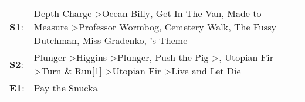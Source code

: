 \begin{supertabular}{p{0.03\textwidth}p{0.92\textwidth}}
 \textbf{S1}:  &                Depth Charge\textsuperscript{} \textgreater \enspace Ocean Billy\textsuperscript{}, \enspace Get In The Van\textsuperscript{}, \enspace Made to Measure\textsuperscript{} \textgreater \enspace Professor Wormbog\textsuperscript{}, \enspace Cemetery Walk\textsuperscript{}, \enspace The Fussy Dutchman\textsuperscript{}, \enspace Miss Gradenko\textsuperscript{}, 's Theme\textsuperscript{}  \enspace  \\
 \textbf{S2}:  &  Plunger\textsuperscript{} \textgreater \enspace Higgins\textsuperscript{} \textgreater \enspace Plunger\textsuperscript{}, \enspace Push the Pig\textsuperscript{} \textgreater {}\textsuperscript{}, \enspace Utopian Fir\textsuperscript{} \textgreater \enspace Turn \& Run[1]\textsuperscript{} \textgreater \enspace Utopian Fir\textsuperscript{} \textgreater \enspace Live and Let Die\textsuperscript{}  \enspace  \\
 \textbf{E1}:  &                                                                                                                                                                                                                                                                                                                                                                                             Pay the Snucka\textsuperscript{}  \enspace  \\
\end{supertabular}
